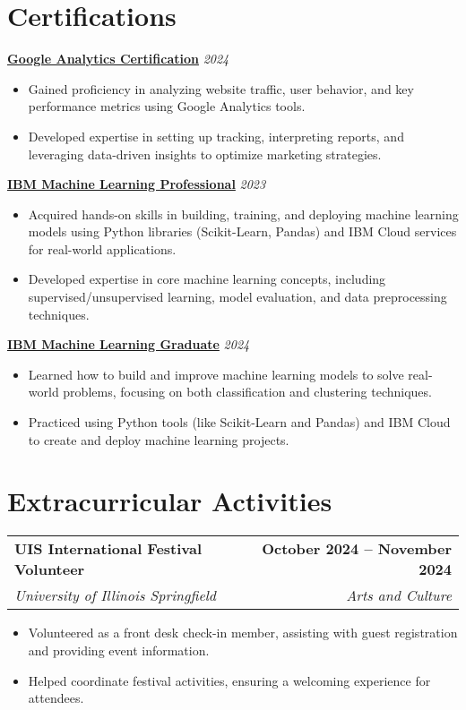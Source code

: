 \documentclass[letterpaper,11pt]{article}
\makeatletter
\newcommand{\resumeItem}[1]{
  \item\small{
    {#1 \vspace{-2pt}}
  }
}
\newcommand{\resumeSubheading}[4]{
  \vspace{-2pt}\item
    \begin{tabular*}{1.0\textwidth}[t]{l@{\extracolsep{\fill}}r}
      \textbf{#1} & \textbf{\small #2} \\
      \textit{\small#3} & \textit{\small #4} \\
    \end{tabular*}\vspace{-7pt}
}
\newcommand{\resumeItemListStart}{\begin{itemize}}
\newcommand{\resumeItemListEnd}{\end{itemize}\vspace{-5pt}}
\makeatother
\begin{document}
\section*{Certifications}
\item \textbf{\href{https://skillshop.credential.net/9c8571fe-ad59-4984-b8b5-6c0470d70f73}{Google Analytics Certification}} \hfill \textit{2024}
\begin{itemize}
\item Gained proficiency in analyzing website traffic, user behavior, and key performance metrics using Google Analytics tools.
\item Developed expertise in setting up tracking, interpreting reports, and leveraging data-driven insights to optimize marketing strategies.
\end{itemize}
\item \textbf{\href{https://www.coursera.org/account/accomplishments/professional-cert/3P5H4ZJ6XQXA}{IBM Machine Learning Professional}} \hfill \textit{2023}
\begin{itemize}
\item Acquired hands-on skills in building, training, and deploying machine learning models using Python libraries (Scikit-Learn, Pandas) and IBM Cloud services for real-world applications.
\item Developed expertise in core machine learning concepts, including supervised/unsupervised learning, model evaluation, and data preprocessing techniques.
\end{itemize}
\item \textbf{\href{https://www.credly.com/badges/c5e2a324-14f0-4893-9e3a-ccb7c7e3ce4b/public_url}{IBM Machine Learning Graduate}} \hfill \textit{2024}
\begin{itemize}
\item Learned how to build and improve machine learning models to solve real-world problems, focusing on both classification and clustering techniques.
\item Practiced using Python tools (like Scikit-Learn and Pandas) and IBM Cloud to create and deploy machine learning projects.
\end{itemize}

\section{Extracurricular Activities}
\resumeSubheading
    {UIS International Festival Volunteer}{October 2024 – November 2024}
    {University of Illinois Springfield} {Arts and Culture}
    \resumeItemListStart
        \resumeItem{Volunteered as a front desk check-in member, assisting with guest registration and providing event information.}
        \resumeItem{Helped coordinate festival activities, ensuring a welcoming experience for attendees.}
    \resumeItemListEnd
\end{document}
